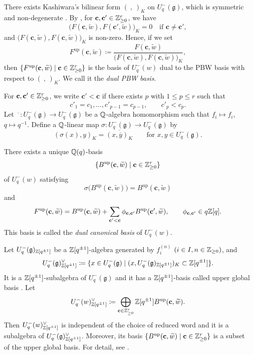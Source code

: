 There exists Kashiwara's bilinear form $(\ ,\ )_K$
on $U_q^-(\mathfrak{g})$, which is symmetric and non-degenerate
\cite[Section 3.4]{Kas91}.
By \cite[Lemma 1.4.4, Proposition 38.2.3]{Lusbook},
for $\mathbf{c}, \mathbf{c}' \in \mathbb{Z}_{\geq 0}^r$, we have
\[
\bigl(F(\mathbf{c}, \widetilde{w}),
F(\mathbf{c}', \widetilde{w})\bigr)_K = 0
\quad \text{if } \mathbf{c} \neq \mathbf{c}',
\]
and $\bigl(F(\mathbf{c}, \widetilde{w}),
F(\mathbf{c}, \widetilde{w})\bigr)_K$ is non-zero.
Hence, if we set
\[
F^{\mathrm{up}}(\mathbf{c}, \widetilde{w}) \coloneq
\frac{F(\mathbf{c}, \widetilde{w})}
{\bigl(F(\mathbf{c}, \widetilde{w}),
F(\mathbf{c}, \widetilde{w})\bigr)_K},
\]
then $\{F^{\mathrm{up}}(\mathbf{c}, \widetilde{w}) \mid
\mathbf{c} \in \mathbb{Z}_{\geq 0}^r\}$ is the basis of $U_q^-(w)$
dual to the PBW basis with respect to $(\ ,\ )_K$.
We call it the \emph{dual PBW basis}.

For $\mathbf{c}, \mathbf{c}' \in \mathbb{Z}_{\geq 0}^r$,
we write $\mathbf{c}' < \mathbf{c}$ if there exists $p$
with $1 \leq p \leq r$ such that
\[
c'_1 = c_1, \ldots, c'_{p - 1} = c_{p - 1}, \qquad c'_p < c_p.
\]
Let $\overline{\phantom{x}} : U_q^-(\mathfrak{g})
\to U_q^-(\mathfrak{g})$ be a $\mathbb{Q}$-algebra homomorphism
such that $f_i \mapsto f_i$, $q \mapsto q^{-1}$.
Define a $\mathbb{Q}$-linear map $\sigma : U_q^-(\mathfrak{g})
\to U_q^-(\mathfrak{g})$ by
\[
(\sigma(x), y)_K = \overline{(x, \overline{y})_K}
\qquad \text{for } x, y \in U_q^-(\mathfrak{g}).
\]

\begin{Prop}
\label{Prop : dual canonical basis}
There exists a unique $\mathbb{Q}(q)$-basis
\[
\{B^{\mathrm{up}}(\mathbf{c}, \widetilde{w}) \mid
\mathbf{c} \in \mathbb{Z}_{\geq 0}^r\}
\]
of $U_q^-(w)$ satisfying
\[
\sigma\bigl(B^{\mathrm{up}}(\mathbf{c}, \widetilde{w})\bigr)
= B^{\mathrm{up}}(\mathbf{c}, \widetilde{w})
\]
and
\[
F^{\mathrm{up}}(\mathbf{c}, \widetilde{w})
= B^{\mathrm{up}}(\mathbf{c}, \widetilde{w})
+ \sum_{\mathbf{c}' < \mathbf{c}}\phi_{\mathbf{c}, \mathbf{c}'}
B^{\mathrm{up}}(\mathbf{c}', \widetilde{w}), \qquad
\phi_{\mathbf{c}, \mathbf{c}'} \in q\mathbb{Z}[q].
\]
This basis is called the \emph{dual canonical basis} of $U_q^-(w)$.
\end{Prop}

Let $U_q^-(\mathfrak{g})_{\mathbb{Z}[q^{\pm 1}]}$
be a $\mathbb{Z}[q^{\pm 1}]$-algebra generated by
$f_i^{(n)}$ $(i \in I, n \in \mathbb{Z}_{\geq 0})$, and
\[
U_q^-(\mathfrak{g})_{\mathbb{Z}[q^{\pm 1}]}^\vee \coloneq
\{x \in U_q^-(\mathfrak{g}) \mid
(x, U_q^-(\mathfrak{g})_{\mathbb{Z}[q^{\pm 1}]})_K
\subset \mathbb{Z}[q^{\pm 1}]\}.
\]
It is a $\mathbb{Z}[q^{\pm 1}]$-subalgebra of $U_q^-(\mathfrak{g})$
and it has a $\mathbb{Z}[q^{\pm 1}]$-basis called upper global basis
\cite{Kas91}.
Let
\[
U_q^-(w)_{\mathbb{Z}[q^{\pm 1}]}^\vee \coloneq
\bigoplus_{\mathbf{c} \in \mathbb{Z}_{\geq 0}^r}
\mathbb{Z}[q^{\pm 1}]B^{\mathrm{up}}(\mathbf{c}, \widetilde{w}).
\]
Then $U_q^-(w)_{\mathbb{Z}[q^{\pm 1}]}^\vee$
is independent of the choice of reduced word
and it is a subalgebra of $U_q^-(\mathfrak{g})_{\mathbb{Z}[q^{\pm 1}]}^\vee$.
Moreover, its basis
$\{B^{\mathrm{up}}(\mathbf{c}, \widetilde{w}) \mid
\mathbf{c} \in \mathbb{Z}_{\geq 0}^r\}$
is a subset of the upper global basis.
For detail, see \cite[$\S$4.7]{Kim12}.

